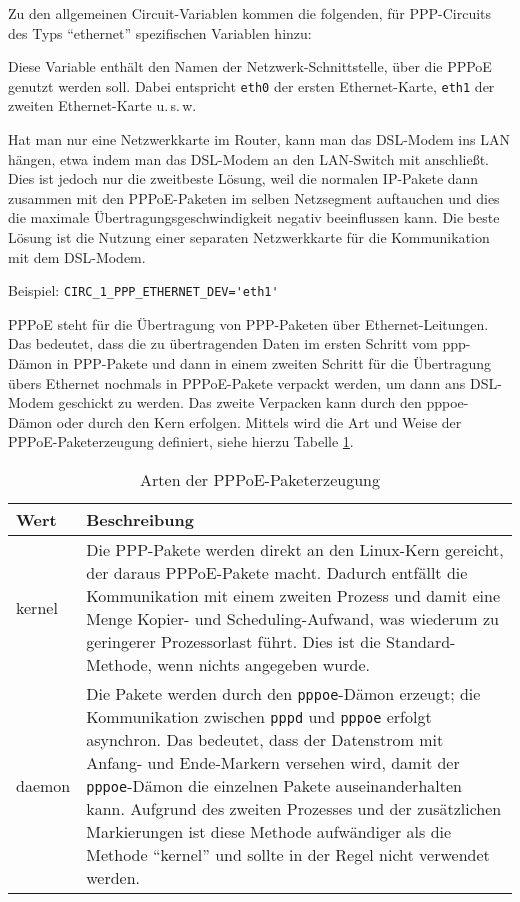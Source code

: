 Zu den allgemeinen Circuit-Variablen kommen die folgenden, für PPP-Circuits des
Typs ``ethernet'' spezifischen Variablen hinzu:

\begin{description}

Diese Variable enthält den Namen der Netzwerk-Schnitt\-stelle, über die PPPoE
genutzt werden soll. Dabei entspricht \texttt{eth0} der ersten Ethernet-Karte,
\texttt{eth1} der zweiten Ethernet-Karte u.\,s.\,w.

Hat man nur eine Netzwerkkarte im Router, kann man das DSL-Modem ins LAN
hängen, etwa indem man das DSL-Modem an den LAN-Switch mit anschließt.
Dies ist jedoch nur die zweitbeste Lösung, weil die normalen IP-Pakete
dann zusammen mit den PPPoE-Paketen im selben Netzsegment auftauchen und dies
die maximale Übertragungsgeschwindigkeit negativ beeinflussen kann. Die beste
Lösung ist die Nutzung einer separaten Netzwerkkarte für die Kommunikation mit
dem DSL-Modem.

Beispiel: \verb+CIRC_1_PPP_ETHERNET_DEV='eth1'+


PPPoE steht für die Übertragung von PPP-Paketen über
Ethernet-Leitungen. Das bedeutet, dass die zu übertragenden Daten im ersten
Schritt vom ppp-Dämon in PPP-Pakete und dann in einem zweiten Schritt für die
Übertragung übers Ethernet nochmals in PPPoE-Pakete verpackt werden, um dann
ans DSL-Modem geschickt zu werden. Das zweite Verpacken kann durch den
pppoe-Dämon oder durch den Kern erfolgen. Mittels
 wird die Art und Weise der
PPPoE-Paketerzeugung definiert, siehe hierzu Tabelle \ref{tab:pppoe-type}.

\begin{table}[h!]
  \centering
  \begin{tabular}{|l|p{10cm}|}
    \hline
    Wert & Beschreibung \\
    \hline
    kernel & Die PPP-Pakete werden direkt an den Linux-Kern
    gereicht, der daraus PPPoE-Pakete macht. Dadurch entfällt die
    Kommunikation mit einem zweiten Prozess und damit eine Menge
    Kopier- und Scheduling-Aufwand, was wiederum zu geringerer Prozessorlast
    führt. Dies ist die Standard-Methode, wenn nichts angegeben wurde.\\
    daemon & Die Pakete werden durch den \texttt{pppoe}-Dämon erzeugt; die
    Kommunikation zwischen \texttt{pppd} und \texttt{pppoe} erfolgt asynchron.
    Das bedeutet, dass der Datenstrom mit Anfang- und Ende-Markern versehen
    wird, damit der \texttt{pppoe}-Dämon die einzelnen Pakete auseinanderhalten
    kann. Aufgrund des zweiten Prozesses und der zusätzlichen Markierungen ist
    diese Methode aufwändiger als die Methode ``kernel'' und sollte in der
    Regel nicht verwendet werden.\\
    \hline
  \end{tabular}
  \caption{Arten der PPPoE-Paketerzeugung}
  \label{tab:pppoe-type}
\end{table}


\end{description}
